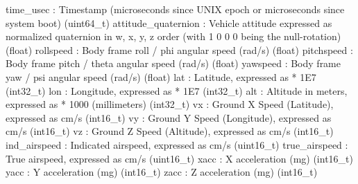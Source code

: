 \begin{DoxyVerb}
\begin{DoxyVerb}
\begin{DoxyVerb}
\begin{DoxyVerb}
\begin{DoxyVerb}
time_usec                 : Timestamp (microseconds since UNIX epoch or microseconds since system boot) (uint64_t)
attitude_quaternion        : Vehicle attitude expressed as normalized quaternion in w, x, y, z order (with 1 0 0 0 being the null-rotation) (float)
rollspeed                 : Body frame roll / phi angular speed (rad/s) (float)
pitchspeed                : Body frame pitch / theta angular speed (rad/s) (float)
yawspeed                  : Body frame yaw / psi angular speed (rad/s) (float)
lat                       : Latitude, expressed as * 1E7 (int32_t)
lon                       : Longitude, expressed as * 1E7 (int32_t)
alt                       : Altitude in meters, expressed as * 1000 (millimeters) (int32_t)
vx                        : Ground X Speed (Latitude), expressed as cm/s (int16_t)
vy                        : Ground Y Speed (Longitude), expressed as cm/s (int16_t)
vz                        : Ground Z Speed (Altitude), expressed as cm/s (int16_t)
ind_airspeed              : Indicated airspeed, expressed as cm/s (uint16_t)
true_airspeed             : True airspeed, expressed as cm/s (uint16_t)
xacc                      : X acceleration (mg) (int16_t)
yacc                      : Y acceleration (mg) (int16_t)
zacc                      : Z acceleration (mg) (int16_t)\end{DoxyVerb}
 \mbox{\label{classpymavlink_1_1dialects_1_1v10_1_1MAVLink_a0053e5633c3190cb376281e785157446}} 

\end{DoxyVerb}
\end{DoxyVerb}
\end{DoxyVerb}
\end{DoxyVerb}
